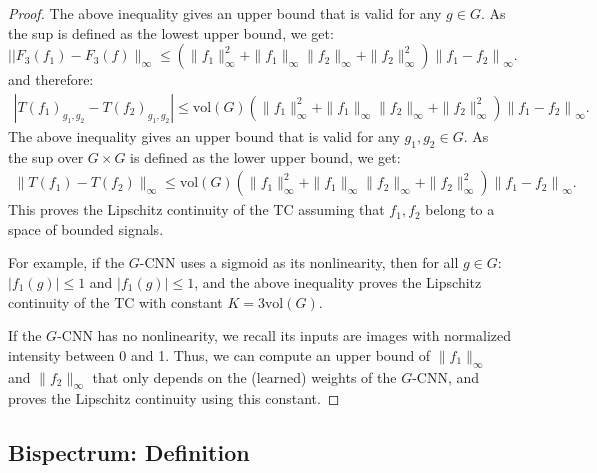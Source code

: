 \documentclass{article}
\begin{document}
\begin{proof}
The above inequality gives an upper bound that is valid for any $g \in G$. As the sup is defined as the lowest upper bound, we get:
\begin{equation}
    ||F_3(f_1) - F_3(f)\|_{\infty} \leq \left( \|f_1\|_\infty^2 + \|f_1\|_\infty\|f_2\|_\infty + \|f_2\|_\infty^2\right) \left\|f_1-f_2\right\|_{\infty}.
\end{equation}
and therefore:
\begin{align*}
 \left|T\left(f_1\right)_{g_1,g_2}-T(f_2)_{g_1,g_2}\right|
    \leq \text{vol}(G) \left( \|f_1\|_\infty^2 + \|f_1\|_\infty\|f_2\|_\infty + \|f_2\|_\infty^2\right) \left\|f_1-f_2\right\|_{\infty}.
\end{align*}
The above inequality gives an upper bound that is valid for any $g_1, g_2 \in G$. As the sup over $G \times G$ is defined as the lower upper bound, we get:
\begin{align*}
 \|T\left(f_1\right)-T(f_2)\|_\infty
    \leq \text{vol}(G) \left( \|f_1\|_\infty^2 + \|f_1\|_\infty\|f_2\|_\infty + \|f_2\|_\infty^2\right) \left\|f_1-f_2\right\|_{\infty}.
\end{align*}
This proves the Lipschitz continuity of the TC assuming that $f_1, f_2$ belong to a space of bounded signals.

For example, if the $G$-CNN uses a sigmoid as its nonlinearity, then for all $g \in G$: $|f_1(g)| \leq 1$ and $|f_1(g)| \leq 1$, and the above inequality proves the Lipschitz continuity of the TC with constant $K=3\text{vol}(G)$.

If the $G$-CNN has no nonlinearity, we recall its inputs are images with normalized intensity between 0 and 1. Thus, we can compute an upper bound of $\|f_1\|_\infty$ and $\|f_2\|_\infty$ that only depends on the (learned) weights of the $G$-CNN, and proves the Lipschitz continuity using this constant.
\end{proof}



\subsection{Bispectrum: Definition}
\end{document}
